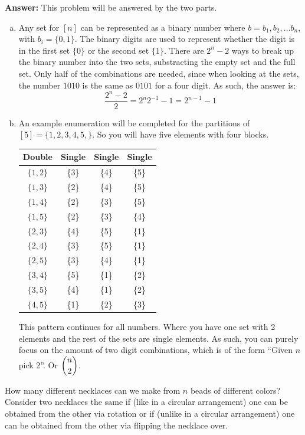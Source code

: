 \documentclass{article}
\begin{document}
\textbf{Answer:} This problem will be answered by the two parts.
\begin{enumerate}[(a)]
    \item Any set for $[n]$ can be represented as a binary number where $b = b_1, b_2, \dots b_n$, with $b_i = \{0, 1\}$. The binary digits are used to represent whether the digit is in the first set $\{0\}$ or the second set $\{1\}$. There are $2^{n} - 2$ ways to break up the binary number into the two sets, substracting the empty set and the full set. Only half of the combinations are needed, since when looking at the sets, the number $1010$ is the same as $0101$ for a four digit. As such, the answer is:
    \begin{equation*}
        \frac{2^n - 2}{2} = 2^{n}2^{-1} - 1 = 2^{n-1} - 1
    \end{equation*}
    \item An example enumeration will be completed for the partitions of $[5] = \{1, 2, 3, 4, 5, \}$. So you will have five elements with four blocks.
    \begin{center}
        \begin{tabular}{c|c|c|c}
        Double & Single & Single & Single \\
        \hline
        $\{1,2\}$ & \{3\} & \{4\} & \{5\} \\
        $\{1,3\}$ & \{2\} & \{4\} & \{5\} \\
        $\{1,4\}$ & \{2\} & \{3\} & \{5\} \\
        $\{1,5\}$ & \{2\} & \{3\} & \{4\} \\
        $\{2,3\}$ & \{4\} & \{5\} & \{1\} \\
        $\{2,4\}$ & \{3\} & \{5\} & \{1\} \\
        $\{2,5\}$ & \{3\} & \{4\} & \{1\} \\
        $\{3,4\}$ & \{5\} & \{1\} & \{2\} \\
        $\{3,5\}$ & \{4\} & \{1\} & \{2\} \\
        $\{4,5\}$ & \{1\} & \{2\} & \{3\}
        \end{tabular}
    \end{center}
    This pattern continues for all numbers. Where you have one set with 2 elements and the rest of the sets are single elements. As such, you can purely focus on the amount of two digit combinations, which is of the form ``Given $n$ pick 2''. Or $\dbinom{n}{2}$.
\end{enumerate}

\setcounter{problem}{14}
\begin{problem} %
How many different necklaces can we make from $n$ beads of different colors? Consider two necklaces the same if (like in a circular arrangement) one can be obtained from the other via rotation or if (unlike in a circular arrangement) one can be obtained from the other via flipping the necklace over.
\end{problem}
\end{document}
